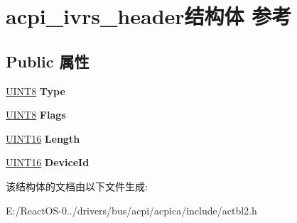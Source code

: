 \hypertarget{structacpi__ivrs__header}{}\section{acpi\+\_\+ivrs\+\_\+header结构体 参考}
\label{structacpi__ivrs__header}
\subsection*{Public 属性}
\begin{DoxyCompactItemize}
\item 
\mbox{\label{structacpi__ivrs__header_a7aef921d913a76caf775b5474d540fa2}} 
\hyperlink{_processor_bind_8h_ab27e9918b538ce9d8ca692479b375b6a}{U\+I\+N\+T8} {\bfseries Type}
\item 
\mbox{\label{structacpi__ivrs__header_a655f19d6996b383359b64fa1a350b5fb}} 
\hyperlink{_processor_bind_8h_ab27e9918b538ce9d8ca692479b375b6a}{U\+I\+N\+T8} {\bfseries Flags}
\item 
\mbox{\label{structacpi__ivrs__header_a94a2b325c2b88f62366fc66f4692293d}} 
\hyperlink{_processor_bind_8h_a09f1a1fb2293e33483cc8d44aefb1eb1}{U\+I\+N\+T16} {\bfseries Length}
\item 
\mbox{\label{structacpi__ivrs__header_a7f4d885323ae387d948b2c7a479ea436}} 
\hyperlink{_processor_bind_8h_a09f1a1fb2293e33483cc8d44aefb1eb1}{U\+I\+N\+T16} {\bfseries Device\+Id}
\end{DoxyCompactItemize}


该结构体的文档由以下文件生成\+:\begin{DoxyCompactItemize}
\item 
E\+:/\+React\+O\+S-\/0../drivers/bus/acpi/acpica/include/actbl2.\+h\end{DoxyCompactItemize}
